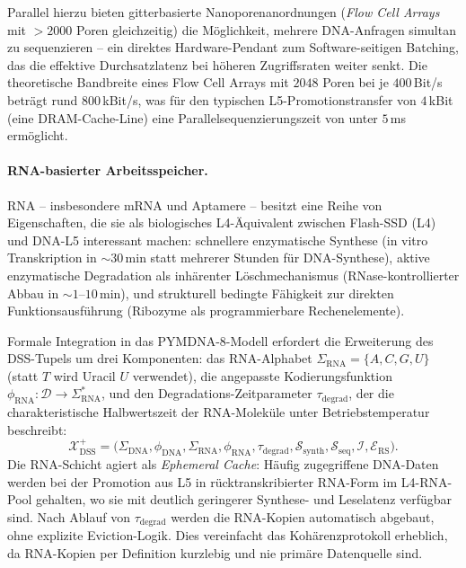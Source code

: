 ﻿\documentclass[a4paper,12pt]{article}
\theoremstyle{definition}
\begin{document}
Parallel hierzu bieten gitterbasierte Nanoporenanordnungen (\emph{Flow Cell Arrays} mit $> 2000$ Poren gleichzeitig) die Möglichkeit, mehrere DNA-Anfragen simultan zu sequenzieren -- ein direktes Hardware-Pendant zum Software-seitigen Batching, das die effektive Durchsatzlatenz bei höheren Zugriffsraten weiter senkt. Die theoretische Bandbreite eines Flow Cell Arrays mit $2048$ Poren bei je $400$\,Bit/s beträgt rund $800$\,kBit/s, was für den typischen L5-Promotionstransfer von $4$\,kBit (eine DRAM-Cache-Line) eine Parallelsequenzierungszeit von unter $5$\,ms ermöglicht.

\paragraph{RNA-basierter Arbeitsspeicher.}
RNA -- insbesondere mRNA und Aptamere -- besitzt eine Reihe von Eigenschaften, die sie als biologisches L4-Äquivalent zwischen Flash-SSD (L4) und DNA-L5 interessant machen: schnellere enzymatische Synthese (in vitro Transkription in $\sim 30$\,min statt mehrerer Stunden für DNA-Synthese), aktive enzymatische Degradation als inhärenter Löschmechanismus (RNase-kontrollierter Abbau in $\sim 1$--$10$\,min), und strukturell bedingte Fähigkeit zur direkten Funktionsausführung (Ribozyme als programmierbare Rechenelemente).

Formale Integration in das PYMDNA-8-Modell erfordert die Erweiterung des DSS-Tupels um drei Komponenten: das RNA-Alphabet $\Sigma_{\mathrm{RNA}} = \{A, C, G, U\}$ (statt $T$ wird Uracil $U$ verwendet), die angepasste Kodierungsfunktion $\phi_{\mathrm{RNA}}: \mathcal{D} \to \Sigma_{\mathrm{RNA}}^*$, und den Degradations-Zeitparameter $\tau_{\mathrm{degrad}}$, der die charakteristische Halbwertszeit der RNA-Moleküle unter Betriebstemperatur beschreibt:
\[
  \mathcal{X}_{\mathrm{DSS}}^{+} = \bigl(\Sigma_{\mathrm{DNA}}, \phi_{\mathrm{DNA}}, \Sigma_{\mathrm{RNA}}, \phi_{\mathrm{RNA}}, \tau_{\mathrm{degrad}}, \mathcal{S}_{\mathrm{synth}}, \mathcal{S}_{\mathrm{seq}}, \mathcal{I}, \mathcal{E}_{\mathrm{RS}}\bigr).
\]
Die RNA-Schicht agiert als \emph{Ephemeral Cache}: Häufig zugegriffene DNA-Daten werden bei der Promotion aus L5 in rücktranskribierter RNA-Form im L4-RNA-Pool gehalten, wo sie mit deutlich geringerer Synthese- und Leselatenz verfügbar sind. Nach Ablauf von $\tau_{\mathrm{degrad}}$ werden die RNA-Kopien automatisch abgebaut, ohne explizite Eviction-Logik. Dies vereinfacht das Kohärenzprotokoll erheblich, da RNA-Kopien per Definition kurzlebig und nie primäre Datenquelle sind.
\end{document}
